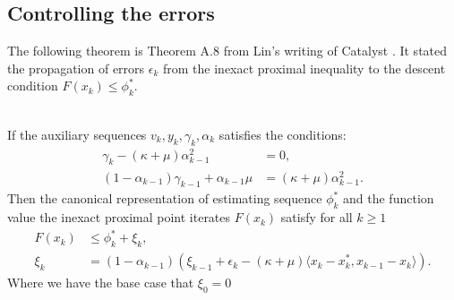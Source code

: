 \documentclass[12pt]{article}
\begin{document}
    \subsection{Controlling the errors}\label{app:sec:appx-nes-seq-errs-ctrl}
        The following theorem is Theorem A.8 from Lin's writing of Catalyst \cite{lin_universal_2015}. 
        It stated the propagation of errors $\epsilon_k$ from the inexact proximal inequality to the descent condition $F(x_k) \le \phi_k^*$. 
        \begin{theorem}\;\\
            If the auxiliary sequences $v_k, y_k, \gamma_k, \alpha_k$ satisfies the conditions: 
            \begin{align*}
                \gamma_k - (\kappa + \mu)\alpha_{k - 1}^2 
                &= 0, 
                \\
                (1 - \alpha_{k - 1})\gamma_{k - 1} + \alpha_{k - 1}\mu 
                &= (\kappa + \mu)\alpha_{k - 1}^2. 
            \end{align*}
            Then the canonical representation of estimating sequence $\phi_k^*$ and the function value 
            the inexact proximal point iterates $F(x_k)$ satisfy for all $k\ge 1$
            \begin{align*}
                F(x_k) &\le \phi_k^* + \xi_k, 
                \\
                \xi_k &= 
                (1 - \alpha_{k - 1})(
                    \xi_{k - 1} + \epsilon_k 
                    - (\kappa + \mu)\langle x_k - x_k^*, x_{k - 1} - x_k\rangle
                ). 
            \end{align*}
            Where we have the base case that $\xi_0 = 0$
        \end{theorem}
\end{document}
